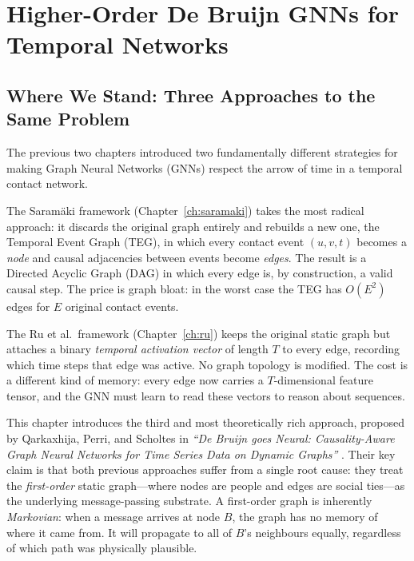 \chapter{Higher-Order De Bruijn GNNs for Temporal Networks}

\section{Where We Stand: Three Approaches to the Same Problem}

The previous two chapters introduced two fundamentally different strategies for making Graph
Neural Networks (GNNs) respect the arrow of time in a temporal contact network.

The Saram\"aki framework (Chapter~\ref{ch:saramaki}) takes the most radical approach: it
discards the original graph entirely and rebuilds a new one, the Temporal Event Graph (TEG),
in which every contact event $(u, v, t)$ becomes a \emph{node} and causal adjacencies between
events become \emph{edges}. The result is a Directed Acyclic Graph (DAG) in which every edge is,
by construction, a valid causal step. The price is graph bloat: in the worst case the TEG has
$O(E^2)$ edges for $E$ original contact events.

The Ru et al.\ framework (Chapter~\ref{ch:ru}) keeps the original static graph but attaches a
binary \emph{temporal activation vector} of length $T$ to every edge, recording which time steps
that edge was active. No graph topology is modified. The cost is a different kind of memory: every
edge now carries a $T$-dimensional feature tensor, and the GNN must learn to read these vectors
to reason about sequences.

This chapter introduces the third and most theoretically rich approach, proposed by Qarkaxhija,
Perri, and Scholtes in \textit{``De Bruijn goes Neural: Causality-Aware Graph Neural Networks
for Time Series Data on Dynamic Graphs''} \cite{qarkaxhija2022}. Their key claim is that both
previous approaches suffer from a single root cause: they treat the \emph{first-order}
static graph---where nodes are people and edges are social ties---as the underlying message-passing
substrate. A first-order graph is inherently \emph{Markovian}: when a message arrives at node
$B$, the graph has no memory of where it came from. It will propagate to all of $B$'s neighbours
equally, regardless of which path was physically plausible.

